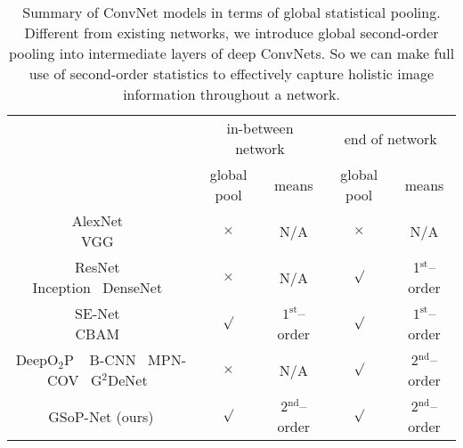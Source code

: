 \documentclass[10pt,twocolumn,letterpaper]{article}
\begin{document}
\begin{table}[t]
	\centering
	\setlength{\tabcolsep}{2pt}
	\renewcommand{\baselinestretch}{1.1}
	\small
	\renewcommand\arraystretch{1.2}
	\begin{tabular}{c|cc|cc}
		\hline	
		& \multicolumn{2}{c|}{in-between network} & \multicolumn{2}{c}{end of network} \\
		\cline{2-5} 
		& global pool & means & global pool & means \\
		\hline
		\parbox{0.8in}{\vspace{1mm}
			AlexNet~\cite{Krizhevsky2012ImageNet}\\ VGG~\cite{Simonyan15}\vspace{1mm}} & $\times$  & N$/$A  & $\times$ & N$/$A \\
		\hline
		\parbox{0.8in}{\vspace{1mm}ResNet~\cite{He_2016_CVPR} \\Inception~\cite{Szegedy_2015_CVPR} DenseNet~\cite{Huang_2017_CVPR}\vspace{1mm}} & $\times$ & N$/$A & $\surd$ & 1$^{\mathrm{st}}$--order \\
		\hline
		\parbox{0.85in}{\vspace{1mm}SE-Net~\cite{Hu_2018_CVPR_SE}\\CBAM~\cite{Woo_2018_ECCV}\vspace{1mm}} & $\surd$ & ${1^\mathrm{st}}$--order & $\surd$ & ${1^\mathrm{st}}$--order\\ 
		\hline
		\parbox{0.85in}{\vspace{1mm}DeepO$_{2}$P~\cite{Ionescu_2015_ICCV}\;$\;$ B-CNN~\cite{lin2015bilinear} \\MPN-COV~\cite{Li_2017_ICCV} G$^{2}$DeNet~\cite{Wang_2017_CVPR}\vspace{1mm}} & $\times$ & N$/$A & $\surd$ & 2$^{\mathrm{nd}}$--order \\
		\hline
		GSoP-Net (ours) & $\surd$ & 2$^{\mathrm{nd}}$--order & $\surd$  & 2$^{\mathrm{nd}}$--order \\
		\hline	
	\end{tabular}%
	\renewcommand{\baselinestretch}{1.0}    \vspace{0pt}
	\caption{Summary of  ConvNet models in terms of global statistical  pooling. Different from existing networks, we introduce global second-order pooling into intermediate layers of deep ConvNets. So we can make full use of second-order statistics to effectively capture holistic image information throughout a network.}
	\label{tab:overall}%
\end{table}
\end{document}

